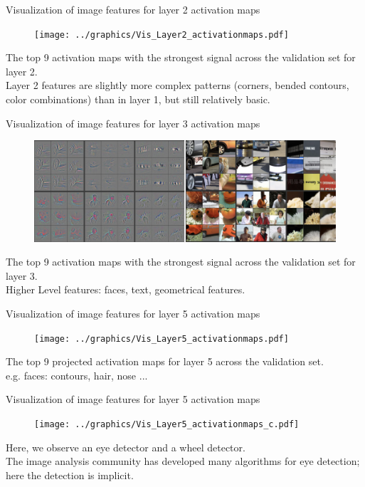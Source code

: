 \documentclass[xcolor=pdftex,dvipsnames,table]{beamer}
\begin{document}
\begin{frame}{Visualization of image features for layer 2 activation maps}
\begin{figure}[htb]
  \centering
  \texttt{[image: ../graphics/Vis\_Layer2\_activationmaps.pdf]}
\end{figure}
The top 9 activation maps with the strongest signal across the validation set for layer 2. \\
Layer 2 features are slightly more complex patterns (corners, bended contours, color combinations) than in layer 1, but still relatively basic.
\end{frame}

\begin{frame}{Visualization of image features for layer 3 activation maps}
\begin{figure}[htb]
  \centering
  \includegraphics[width=\textwidth]{../graphics/Vis_Layer3_activationmaps.png}
\end{figure}
The top 9 activation maps with the strongest signal across the validation set for layer 3. \\
Higher Level features: faces, text, geometrical features.
\end{frame}

\begin{frame}{Visualization of image features for layer 5 activation maps}
\begin{figure}[htb]
  \centering
  \texttt{[image: ../graphics/Vis\_Layer5\_activationmaps.pdf]}
\end{figure}
The top 9 projected activation maps for layer 5 across the validation set. \\
e.g. faces: contours, hair, nose ... 
\end{frame}

\begin{frame}{Visualization of image features for layer 5 activation maps}
\begin{figure}[htb]
  \centering
  \texttt{[image: ../graphics/Vis\_Layer5\_activationmaps\_c.pdf]}
\end{figure}
Here, we observe an eye detector and a wheel detector. \\
The image analysis community has developed many algorithms for eye detection; here the detection is implicit.
\end{frame}
\end{document}
